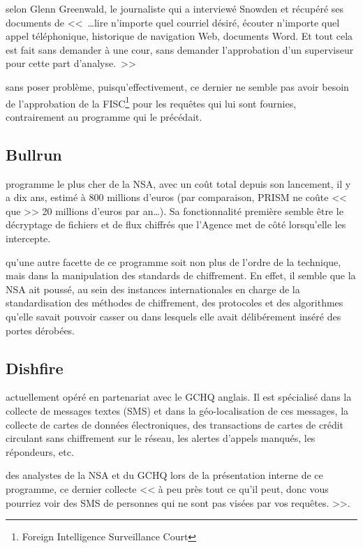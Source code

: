  selon Glenn Greenwald, le journaliste qui a
interviewé Snowden et récupéré ses documents de <<~\ldots lire n'importe quel
courriel désiré, écouter n'importe quel appel téléphonique, historique de
navigation Web, documents Word. Et tout cela est fait sans demander à une cour,
sans demander l'approbation d'un superviseur pour cette part
d'analyse.~>>\cite{GGW}

 sans poser problème, puisqu'effectivement, ce dernier
ne semble pas avoir besoin de l'approbation de la FISC\footnote{Foreign
Intelligence Surveillance Court} pour les requêtes qui lui sont
fournies\cite{Kimery}, contrairement au programme qui le précédait.

\subsection{Bullrun}

 programme le plus cher de la NSA, avec un
coût total depuis son lancement, il y a dix ans, estimé à 800 millions
d'euros\cite{bullrun} (par comparaison, PRISM ne coûte << que >> 20 millions
d'euros par an\ldots).
Sa fonctionnalité première semble être le décryptage de fichiers et de flux
chiffrés que l'Agence met de côté lorsqu'elle les intercepte. 

 qu'une autre facette de ce programme soit non
plus de l'ordre de la technique, mais dans la manipulation des standards de
chiffrement. En effet, il semble que la NSA ait poussé, au sein des instances
internationales en charge de la standardisation des méthodes de chiffrement, des
protocoles et des algorithmes qu'elle savait pouvoir casser\cite{NYTenc} ou dans
lesquels elle avait délibérement inséré des portes dérobées.

\subsection{Dishfire}

 actuellement opéré en partenariat avec le GCHQ
anglais. Il est spécialisé dans la collecte de messages textes (SMS) et dans la
géo-localisation de ces messages, la collecte de cartes de données
électroniques, des transactions de cartes de crédit circulant sans chiffrement sur le réseau,
les alertes d'appels manqués, les répondeurs, etc.

 des analystes de la NSA et du GCHQ lors de la
présentation interne de ce programme, ce dernier collecte << à peu près tout ce
qu'il peut, donc vous pourriez voir des SMS de personnes qui ne sont pas visées
par vos requêtes. >>\cite{Guardian}.

